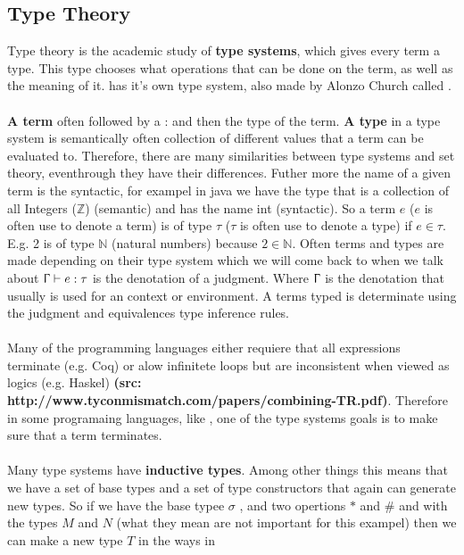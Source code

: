 \subsection{Type Theory}
\label{Type Theory}
Type theory is the academic study of \textbf{type systems}, 
which gives every term a type. This type chooses what operations 
that can be done on the term, as well as the meaning of it. 
 has it's own type system, also made 
by Alonzo Church called .
\\ \\
\textbf{A term} often followed by a : and then the type of the term.
\textbf{A type} in a type system is semantically often collection of different
values that a term can be evaluated to. Therefore, there are many 
similarities between type systems and set theory, eventhrough they 
have their differences. Futher more the name of a given term is the syntactic, 
for exampel in java we have the type that  is a collection of all Integers ($\mathbb{Z}$) (semantic) 
and has the name int (syntactic).
So a term $e$ ($e$ is often use to denote a term) is of type 
$\tau$ ($\tau$ is often use to denote a type) if $e \in \tau$. 
E.g. 2 is of type $\mathbb{N}$ (natural numbers) because 
$2 \in \mathbb{N}$. Often terms and types are made depending on their 
type system which we will come back to when we talk about 
$\Upgamma \vdash e:\tau$ is the denotation of a judgment. 
Where $\Upgamma$ is the denotation that usually is used for an 
context or environment. A terms typed is determinate using the 
judgment and equivalences type inference rules. 
\\ \\
Many of the programming languages either requiere that all expressions terminate (e.g. Coq) or alow 
infinitete loops but are inconsistent when viewed as logics (e.g. Haskel) \textbf{(src: http://www.tyconmismatch.com/papers/combining-TR.pdf)}.
Therefore in some programaing languages, like , one of the type systems goals 
is to make sure that a term terminates. 
\\ \\
Many type systems have \textbf{inductive types}. Among other things this means that we have a set of base types
and a set of type constructors that again can generate new types. So if we have the base typee $\sigma$ , 
and two opertions $*$ and $\#$ and with the types $M$ and $N$ (what they mean are not important for this exampel) 
then we can make a new type $T$ in the ways in  

